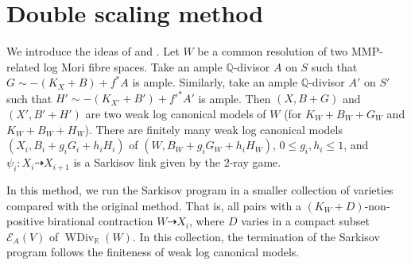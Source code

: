 \documentclass[11pt]{amsart}
\begin{document}
\section{Double scaling method}
We introduce the ideas of \cite[\S 13]{haconMinimalModelProgram2012} and  \cite{liuSarkisovProgramGeneralized2021}.
 Let $W$ be a common resolution of two MMP-related log Mori fibre spaces. Take an ample $\mathbb{Q}$-divisor $A$ on $S$ such that $G\sim -(K_{X}+B) +f^*A$  is ample. Similarly, take an ample $\mathbb{Q}$-divisor $A'$ on $S'$ such that $H'\sim -(K_{X'}+B') +f'^*A'$  is ample. Then  $(X,B+G)$ and $(X',B'+H')$ are two weak log canonical models of $W$ (for $K_{W}+B_{W}+G_{W}$ and $K_{W}+B_{W}+H_{W}$). There are finitely many weak log canonical models $(X_{i},B_{i}+g_{i}G_{i}+h_{i}H_{i})$ of $(W,B_{W}+g_{i}G_{W}+h_{i}H_{W})$, $0\leqslant g_i,h_i\leqslant 1$, and $\psi_{i}:X_{i}\dashrightarrow X_{i+1}$ is a Sarkisov link given by the $2$-ray game.

In this method, we run the Sarkisov program in a smaller collection of varieties compared with the original method. That is, all pairs with a $(K_{W}+D)$-non-positive birational contraction $W\dashrightarrow X_{i}$, where $D$ varies in a compact subset $\mathcal{E}_{A}(V)$ of $\operatorname{WDiv}_{\mathbb{R}}(W)$. In this collection, the termination of the Sarkisov program follows the finiteness of weak log canonical models. 
\end{document}
